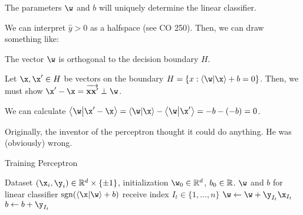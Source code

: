 \documentclass[class=cs480,notes,tikz]{agony}
\begin{document}
The parameters $\w$ and $b$ will uniquely determine the linear classifier.

\begin{example}
  We can interpret $\hat y > 0$ as a halfspace (see CO 250).
  Then, we can draw something like:
  \begin{center}
  \end{center}
\end{example}

\begin{prop}
  The vector $\w$ is orthogonal to the decision boundary $H$.
\end{prop}
\begin{prf}
  Let $\x, \x' \in H$ be vectors on the boundary $H = \{x : \ip{\w}{\x} + b = 0\}$.
  Then, we must show $\x' - \x = \overrightarrow{\vb{xx'}} \perp \w$.

  We can calculate $\ip{\w}{\x' - \x}
    = \ip{\w}{\x} - \ip{\w}{\x'}
    = -b - (-b) = 0$.
\end{prf}

Originally, the inventor of the perceptron thought it could do anything.
He was (obviously) wrong.

\begin{algorithm}[H]
  \caption{Training Perceptron}
  \begin{algorithmic}
    \Require Dataset $(\x_i, \y_i) \in \R^d \times \{\pm 1\}$,
    initialization $\w_0 \in \R^d$, $b_0 \in \mathbb{R}$.
    \Ensure $\w$ and $b$ for linear classifier $\sgn(\ip{\x}{\w} + b)$
      \State receive index $I_t \in \{1,\dotsc,n\}$
        \State $\w \gets \w + \y_{I_t}\x_{I_t}$
        \State $b \gets b + \y_{I_t}$
      \EndIf
    \EndFor
  \end{algorithmic}
\end{algorithm}
\end{document}
